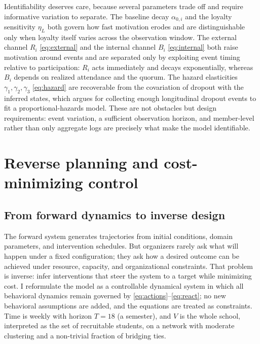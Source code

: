 \documentclass[11pt]{article}
\begin{document}
Identifiability deserves care, because several parameters trade off and require informative variation to separate. The baseline decay $\alpha_{0,i}$ and the loyalty sensitivity $\eta_L$ both govern how fast motivation erodes and are distinguishable only when loyalty itself varies across the observation window. The external channel $R_i$ \eqref{eq:external} and the internal channel $B_i$ \eqref{eq:internal} both raise motivation around events and are separated only by exploiting event timing relative to participation: $R_i$ acts immediately and decays exponentially, whereas $B_i$ depends on realized attendance and the quorum. The hazard elasticities $\gamma_1,\gamma_2,\gamma_3$ \eqref{eq:hazard} are recoverable from the covariation of dropout with the inferred states, which argues for collecting enough longitudinal dropout events to fit a proportional-hazards model. These are not obstacles but design requirements: event variation, a sufficient observation horizon, and member-level rather than only aggregate logs are precisely what make the model identifiable.

\section{Reverse planning and cost-minimizing control}\label{sec:control}

\subsection{From forward dynamics to inverse design}
The forward system generates trajectories from initial conditions, domain parameters, and intervention schedules. But organizers rarely ask what will happen under a fixed configuration; they ask how a desired outcome can be achieved under resource, capacity, and organizational constraints. That problem is inverse: infer interventions that steer the system to a target while minimizing cost. I reformulate the model as a controllable dynamical system in which all behavioral dynamics remain governed by \eqref{eq:actions}--\eqref{eq:react}; no new behavioral assumptions are added, and the equations are treated as constraints. Time is weekly with horizon $T=18$ (a semester), and $V$ is the whole school, interpreted as the set of recruitable students, on a network with moderate clustering and a non-trivial fraction of bridging ties.
\end{document}

